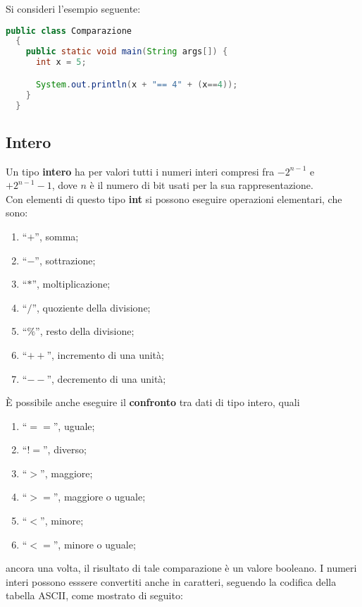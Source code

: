 \documentclass[a4paper]{extarticle}
\newcommand{\quotes}[1]{``#1''}
\begin{document}
\vspace{1em}
\noindent
Si consideri l'esempio seguente:

\begin{lstlisting}[language=Java, caption=Comparazione tra due numeri costanti in Java]
  public class Comparazione
  {
    public static void main(String args[]) {
      int x = 5;

      System.out.println(x + "== 4" + (x==4));
    }
  }
\end{lstlisting}

\vspace{1em}
\subsection{Intero}
Un tipo \textbf{intero} ha per valori tutti i numeri interi compresi fra $-2^{n-1}$ e $+2^{n-1} - 1$, dove $n$ è il numero di bit usati per la sua rappresentazione.\\
Con elementi di questo tipo \textbf{int} si possono eseguire operazioni elementari, che sono:
\begin{enumerate}
  \item \quotes{$+$}, somma;
  \item \quotes{$-$}, sottrazione;
  \item \quotes{$\ast$}, moltiplicazione;
  \item \quotes{$/$}, quoziente della divisione;
  \item \quotes{$\%$}, resto della divisione;
  \item \quotes{$++$}, incremento di una unità;
  \item \quotes{$--$}, decremento di una unità;
\end{enumerate}
È possibile anche eseguire il \textbf{confronto} tra dati di tipo intero, quali
\begin{enumerate}
  \item \quotes{$==$}, uguale;
  \item \quotes{$!=$}, diverso;
  \item \quotes{$>$}, maggiore;
  \item \quotes{$>=$}, maggiore o uguale;
  \item \quotes{$<$}, minore;
  \item \quotes{$<=$}, minore o uguale;
\end{enumerate}
ancora una volta, il risultato di tale comparazione è un valore booleano. I numeri interi possono esssere convertiti anche in caratteri, seguendo la codifica della tabella ASCII, come mostrato di seguito:
\end{document}
